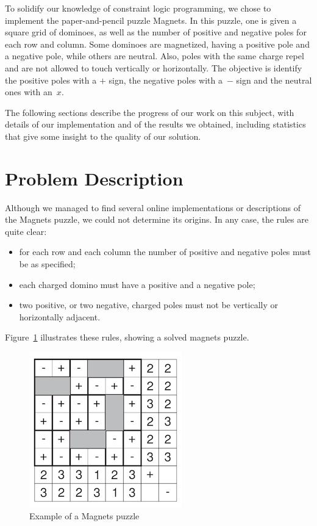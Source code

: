 \documentclass{llncs}
\begin{document}
To solidify our knowledge of constraint logic programming, we chose to implement the paper-and-pencil puzzle Magnets. In this puzzle, one is given a square grid of dominoes, as well as the number of positive and negative poles for each row and column. Some dominoes are magnetized, having a positive pole and a negative pole, while others are neutral. Also, poles with the same charge repel and are not allowed to touch vertically or horizontally. The objective is identify the positive poles with a $+$ sign, the negative poles with a~$-$ sign and the neutral ones with an~$x$.

The following sections describe the progress of our work on this subject, with details of our implementation and of the results we obtained, including statistics that give some insight to the quality of our solution.



\section{Problem Description} 

Although we managed to find several online implementations or descriptions of the Magnets puzzle, we could not determine its origins. In any case, the rules are quite clear:
\begin{itemize}
	\item for each row and each column the number of positive and negative poles must be as specified;
	\item each charged domino must have a positive and a negative pole;
	\item two positive, or two negative, charged poles must not be vertically or horizontally adjacent.
\end{itemize}
Figure~\ref{example} illustrates these rules, showing a solved magnets puzzle.

\begin{figure}[htbp]
\begin{center}
\includegraphics[scale=0.6]{magnets.jpg}
\caption{Example of a Magnets puzzle}
\label{example}
\end{center}
\end{figure}
\end{document}
